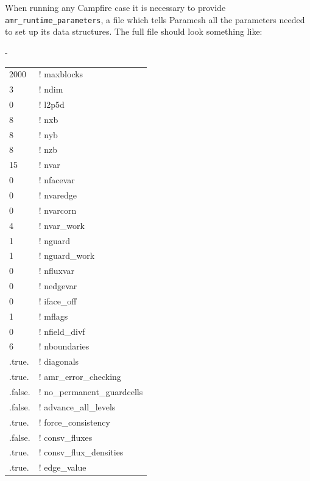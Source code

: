 \documentclass[paper=a4, fontsize=11pt,twoside,bibtotoc]{scrartcl}		%
\newenvironment{codebox}{\begin{center}\begin{MakeFramed}{\hsize0.99\linewidth\advance\hsize-\width\FrameRestore}\tt}{\end{MakeFramed}\end{center}}
\begin{document}
When running any Campfire case it is necessary to provide \texttt{amr\_runtime\_parameters}, a file which tells Paramesh all the parameters needed to set 
up its data structures.  The full file should look something like:
\begin{codebox}
	\begin{tabular}{ll}	
		2000                        & ! maxblocks\\
		3                          & ! ndim\\
		0                          & ! l2p5d\\
		8      	                   & ! nxb\\
		8                          & ! nyb\\
		8                          & ! nzb\\
		15                         & ! nvar\\
		0                          & ! nfacevar\\
		0                          & ! nvaredge\\
		0                          & ! nvarcorn\\
		4                          & ! nvar\_work\\
		1                          & ! nguard\\
		1                          & ! nguard\_work\\
		0                          & ! nfluxvar\\
		0                          & ! nedgevar\\
		0                          & ! iface\_off\\
		1                          & ! mflags\\
		0                          & ! nfield\_divf\\
		6                          & ! nboundaries\\
		.true.                     & ! diagonals\\
		.true.                     & ! amr\_error\_checking\\
		.false.                    & ! no\_permanent\_guardcells\\
		.false.                    & ! advance\_all\_levels\\
		.true.                     & ! force\_consistency\\
		.false.                    & ! consv\_fluxes\\
		.true.                     & ! consv\_flux\_densities\\
		.true.                     & ! edge\_value\\

\end{tabular}
\end{codebox}
\end{document}
